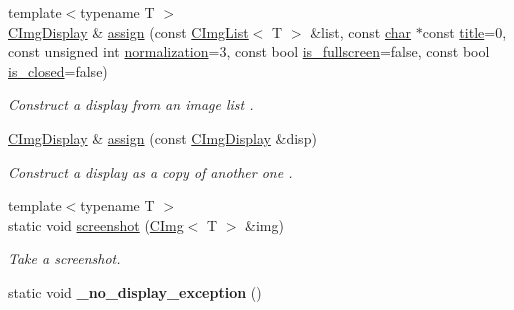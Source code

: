 \begin{DoxyCompactItemize}
{\footnotesize template$<$typename T $>$ }\\\hyperlink{structcimg__library__suffixed_1_1CImgDisplay}{C\+Img\+Display} \& \hyperlink{structcimg__library__suffixed_1_1CImgDisplay_a21c7dd1bf58a438e370a372736a353f6}{assign} (const \hyperlink{structcimg__library__suffixed_1_1CImgList}{C\+Img\+List}$<$ T $>$ \&list, const \hyperlink{classchar}{char} $\ast$const \hyperlink{structcimg__library__suffixed_1_1CImgDisplay_aec4c62a5a049354df77d22f6fe91e95c}{title}=0, const unsigned int \hyperlink{structcimg__library__suffixed_1_1CImgDisplay_a79b6f929fe4aaf411051fc85862191a7}{normalization}=3, const bool \hyperlink{structcimg__library__suffixed_1_1CImgDisplay_a1de2d56a94961193ef833b502120d67e}{is\+\_\+fullscreen}=false, const bool \hyperlink{structcimg__library__suffixed_1_1CImgDisplay_a6fa9d8294099dc9e1e6f67cc67e159c6}{is\+\_\+closed}=false)
\begin{DoxyCompactList}\small\item\em Construct a display from an image list . \end{DoxyCompactList}\item 
\mbox{\label{structcimg__library__suffixed_1_1CImgDisplay_a6639c2ca1ccb868ed1bdf39741518313}} 
\hyperlink{structcimg__library__suffixed_1_1CImgDisplay}{C\+Img\+Display} \& \hyperlink{structcimg__library__suffixed_1_1CImgDisplay_a6639c2ca1ccb868ed1bdf39741518313}{assign} (const \hyperlink{structcimg__library__suffixed_1_1CImgDisplay}{C\+Img\+Display} \&disp)
\begin{DoxyCompactList}\small\item\em Construct a display as a copy of another one . \end{DoxyCompactList}\item 
{\footnotesize template$<$typename T $>$ }\\static void \hyperlink{structcimg__library__suffixed_1_1CImgDisplay_a9682e6106aaaa1b0208421de3cfe5bb4}{screenshot} (\hyperlink{structcimg__library__suffixed_1_1CImg}{C\+Img}$<$ T $>$ \&img)
\begin{DoxyCompactList}\small\item\em Take a screenshot. \end{DoxyCompactList}\item 
\mbox{\label{structcimg__library__suffixed_1_1CImgDisplay_abd7a21f035f4c99b78c2cd6338ea17d8}} 
static void {\bfseries \+\_\+no\+\_\+display\+\_\+exception} ()

\end{DoxyCompactItemize}
